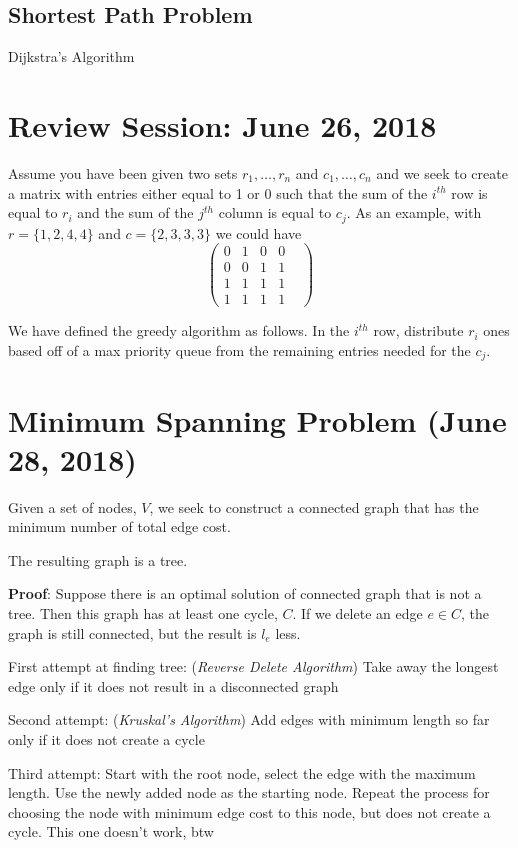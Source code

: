\documentclass[11pt,letterpaper]{article}
\begin{document}
\subsection*{Shortest Path Problem}
Dijkstra's Algorithm

\section*{Review Session: June 26, 2018}
Assume you have been given two sets $r_1,\ldots,r_n$ and $c_1,\ldots,c_n$ and we seek to create a matrix with entries either equal to 1 or 0 such that the sum of the $i^{th}$ row is equal to $r_i$ and the sum of the $j^{th}$ column is equal to $c_j$. As an example, with $r = \{ 1, 2, 4, 4\}$ and $c = \{2, 3, 3, 3\}$ we could have 
\[\begin{pmatrix} 0 & 1 & 0 & 0 \\
0 & 0&1&1& \\
1&1&1&1\\
1&1&1&1
\end{pmatrix}
\]

We have defined the greedy algorithm as follows. In the $i^{th}$ row, distribute $r_i$ ones based off of a max priority queue from the remaining entries needed for the $c_j$.

\section*{Minimum Spanning Problem (June 28, 2018)}
Given a set of nodes, $V$, we seek to construct a connected graph that has the minimum number of total edge cost.

The resulting graph is a tree.

\textbf{Proof}: Suppose there is an optimal solution of connected graph that is not a tree. Then this graph has at least one cycle, $C$. If we delete an edge $e \in C$, the graph is still connected, but the result is $l_e$ less. 

First attempt at finding tree: (\textit{Reverse Delete Algorithm}) Take away the longest edge only if it does not result in a disconnected graph

Second attempt: (\textit{Kruskal's Algorithm}) Add edges with minimum length so far only if it does not create a cycle

Third attempt: Start with the root node, select the edge with the maximum length. Use the newly added node as the starting node. Repeat the process for choosing the node with minimum edge cost to this node, but does not create a cycle. This one doesn't work, btw
\end{document}
